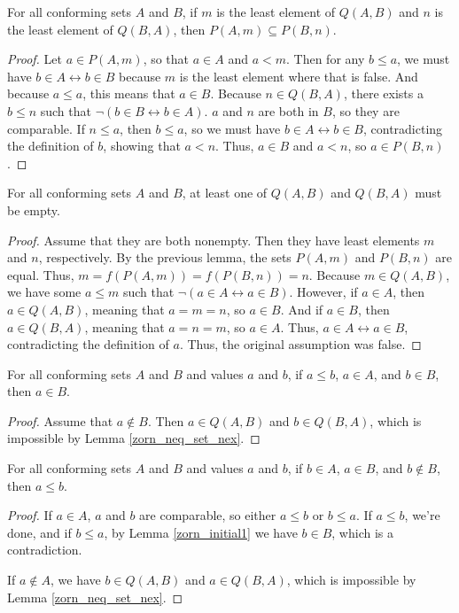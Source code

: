 \documentclass[../../math.tex]{subfiles}
\begin{document}
\begin{lemma} \label{zorn_least_sub}
    For all conforming sets $A$ and $B$, if $m$ is the least element of $Q(A,
    B)$ and $n$ is the least element of $Q(B, A)$, then $P(A, m) \subseteq P(B,
    n)$.
\end{lemma}
\begin{proof}
    Let $a \in P(A, m)$, so that $a \in A$ and $a < m$.  Then for any $b \leq
    a$, we must have $b \in A \leftrightarrow b \in B$ because $m$ is the least
    element where that is false.  And because $a \leq a$, this means that $a \in
    B$.  Because $n \in Q(B, A)$, there exists a $b \leq n$ such that $\neg(b
    \in B \leftrightarrow b \in A)$.  $a$ and $n$ are both in $B$, so they are
    comparable.  If $n \leq a$, then $b \leq a$, so we must have $b \in A
    \leftrightarrow b \in B$, contradicting the definition of $b$, showing that
    $a < n$.  Thus, $a \in B$ and $a < n$, so $a \in P(B, n)$.
\end{proof}

\begin{lemma} \label{zorn_neq_set_nex}
    For all conforming sets $A$ and $B$, at least one of $Q(A, B)$ and $Q(B, A)$
    must be empty.
\end{lemma}
\begin{proof}
    Assume that they are both nonempty.  Then they have least elements $m$ and
    $n$, respectively.  By the previous lemma, the sets $P(A, m)$ and $P(B, n)$
    are equal.  Thus, $m = f(P(A, m)) = f(P(B, n)) = n$.  Because $m \in Q(A,
    B)$, we have some $a \leq m$ such that $\neg(a \in A \leftrightarrow a \in
    B)$.  However, if $a \in A$, then $a \in Q(A, B)$, meaning that $a = m = n$,
    so $a \in B$.  And if $a \in B$, then $a \in Q(B, A)$, meaning that $a = n =
    m$, so $a \in A$.  Thus, $a \in A \leftrightarrow a \in B$, contradicting
    the definition of $a$.  Thus, the original assumption was false.
\end{proof}

\begin{lemma} \label{zorn_initial1}
    For all conforming sets $A$ and $B$ and values $a$ and $b$, if $a \leq b$,
    $a \in A$, and $b \in B$, then $a \in B$.
\end{lemma}
\begin{proof}
    Assume that $a \notin B$.  Then $a \in Q(A, B)$ and $b \in Q(B, A)$, which
    is impossible by Lemma \ref{zorn_neq_set_nex}.
\end{proof}

\begin{lemma} \label{zorn_initial2}
    For all conforming sets $A$ and $B$ and values $a$ and $b$, if $b \in A$, $a
    \in B$, and $b \notin B$, then $a \leq b$.
\end{lemma}
\begin{proof}
    If $a \in A$, $a$ and $b$ are comparable, so either $a \leq b$ or $b \leq
    a$.  If $a \leq b$, we're done, and if $b \leq a$, by Lemma
    \ref{zorn_initial1} we have $b \in B$, which is a contradiction.

    If $a \notin A$, we have $b \in Q(A, B)$ and $a \in Q(B, A)$, which is
    impossible by Lemma \ref{zorn_neq_set_nex}.
\end{proof}
\end{document}
